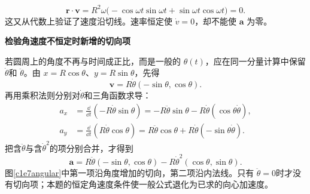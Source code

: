 \begin{solution}
\[
\bm r\cdot\bm v=R^2\omega\bigl(-\cos\omega t\sin\omega t+\sin\omega t\cos\omega t\bigr)=0.
\]
这又从代数上验证了速度沿切线。速率恒定使 $\dot v=0$，却不能使 $\bm a$ 为零。



\par\medskip{}\noindent\textbf{检验角速度不恒定时新增的切向项}\par\nobreak
若圆周上的角度不再与时间成正比，而是一般的 $\theta(t)$，应在同一分量计算中保留 $\dot\theta$和 $\ddot\theta$。由 $x=R\cos\theta$、$y=R\sin\theta$，先得
\[\bm v=R\dot\theta(-\sin\theta,\cos\theta).\]
再用乘积法则分别对$\dot\theta$和三角函数求导：
\begin{align*}
a_x&=\frac{\dd}{\dd t}(-R\dot\theta\sin\theta)
=-R\ddot\theta\sin\theta-R\dot\theta(\cos\theta\dot\theta),\\
a_y&=\frac{\dd}{\dd t}(R\dot\theta\cos\theta)
=R\ddot\theta\cos\theta+R\dot\theta(-\sin\theta\dot\theta).
\end{align*}
把含$\ddot\theta$与含$\dot\theta^2$的项分别合并，才得到
\[\bm a=R\ddot\theta(-\sin\theta,\cos\theta)
          -R\dot\theta^2(\cos\theta,\sin\theta).\]
图\ref{c1e7angular}中第一项沿角度增加的切向，第二项沿内法线。只有 $\ddot\theta=0$时才没有切向项；本题的恒定角速度条件使一般公式退化为已求的向心加速度。
\end{solution}

